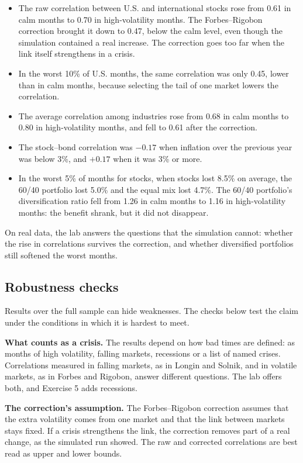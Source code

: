 \begin{itemize}
  \item The raw correlation between U.S. and international stocks rose from 0.61 in calm months to 0.70 in high-volatility months. The Forbes--Rigobon correction brought it down to 0.47, below the calm level, even though the simulation contained a real increase. The correction goes too far when the link itself strengthens in a crisis.
  \item In the worst 10\% of U.S. months, the same correlation was only 0.45, lower than in calm months, because selecting the tail of one market lowers the correlation.
  \item The average correlation among industries rose from 0.68 in calm months to 0.80 in high-volatility months, and fell to 0.61 after the correction.
  \item The stock--bond correlation was $-0.17$ when inflation over the previous year was below 3\%, and $+0.17$ when it was 3\% or more.
  \item In the worst 5\% of months for stocks, when stocks lost 8.5\% on average, the 60/40 portfolio lost 5.0\% and the equal mix lost 4.7\%. The 60/40 portfolio's diversification ratio fell from 1.26 in calm months to 1.16 in high-volatility months: the benefit shrank, but it did not disappear.
\end{itemize}

On real data, the lab answers the questions that the simulation cannot: whether the rise in correlations survives the correction, and whether diversified portfolios still softened the worst months.

\subsection{Robustness checks}
\label{sec:13-stress}

Results over the full sample can hide weaknesses. The checks below test the claim under the conditions in which it is hardest to meet.

\textbf{What counts as a crisis.} The results depend on how bad times are defined: as months of high volatility, falling markets, recessions or a list of named crises. Correlations measured in falling markets, as in Longin and Solnik, and in volatile markets, as in Forbes and Rigobon, answer different questions. The lab offers both, and Exercise 5 adds recessions.

\textbf{The correction's assumption.} The Forbes--Rigobon correction assumes that the extra volatility comes from one market and that the link between markets stays fixed. If a crisis strengthens the link, the correction removes part of a real change, as the simulated run showed. The raw and corrected correlations are best read as upper and lower bounds.

